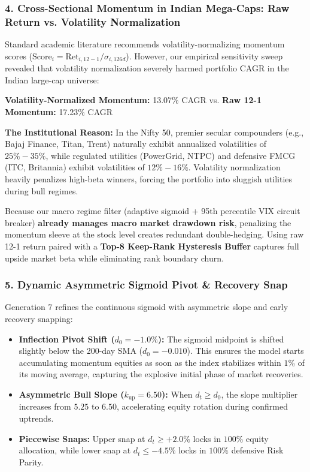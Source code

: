 \documentclass[11pt,a4paper]{article}
\begin{document}
\subsubsection{4. Cross-Sectional Momentum in Indian Mega-Caps: Raw Return vs. Volatility Normalization}
Standard academic literature recommends volatility-normalizing momentum scores ($\text{Score}_i = \text{Ret}_{i, 12-1} / \sigma_{i, 126d}$). However, our empirical sensitivity sweep revealed that volatility normalization severely harmed portfolio CAGR in the Indian large-cap universe:
\begin{center}
\textbf{Volatility-Normalized Momentum:} 13.07\% CAGR \quad vs. \quad \textbf{Raw 12-1 Momentum:} 17.23\% CAGR
\end{center}
\textbf{The Institutional Reason:} In the Nifty 50, premier secular compounders (e.g., Bajaj Finance, Titan, Trent) naturally exhibit annualized volatilities of $25\% - 35\%$, while regulated utilities (PowerGrid, NTPC) and defensive FMCG (ITC, Britannia) exhibit volatilities of $12\% - 16\%$. Volatility normalization heavily penalizes high-beta winners, forcing the portfolio into sluggish utilities during bull regimes.

Because our macro regime filter (adaptive sigmoid + 95th percentile VIX circuit breaker) \textbf{already manages macro market drawdown risk}, penalizing the momentum sleeve at the stock level creates redundant double-hedging. Using raw 12-1 return paired with a \textbf{Top-8 Keep-Rank Hysteresis Buffer} captures full upside market beta while eliminating rank boundary churn.

\subsubsection{5. Dynamic Asymmetric Sigmoid Pivot \& Recovery Snap}
Generation 7 refines the continuous sigmoid with asymmetric slope and early recovery snapping:
\begin{itemize}[leftmargin=*]
    \item \textbf{Inflection Pivot Shift ($d_0 = -1.0\%$):} The sigmoid midpoint is shifted slightly below the 200-day SMA ($d_0 = -0.010$). This ensures the model starts accumulating momentum equities as soon as the index stabilizes within $1\%$ of its moving average, capturing the explosive initial phase of market recoveries.
    \item \textbf{Asymmetric Bull Slope ($k_{\text{up}} = 6.50$):} When $d_t \ge d_0$, the slope multiplier increases from $5.25$ to $6.50$, accelerating equity rotation during confirmed uptrends.
    \item \textbf{Piecewise Snaps:} Upper snap at $d_t \ge +2.0\%$ locks in $100\%$ equity allocation, while lower snap at $d_t \le -4.5\%$ locks in $100\%$ defensive Risk Parity.
\end{itemize}
\end{document}
